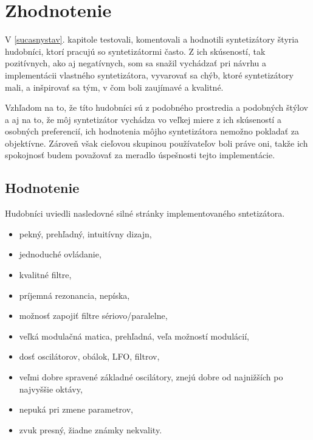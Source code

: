 \chapter{Zhodnotenie}

V \ref{sucasnystav}. kapitole testovali, komentovali a hodnotili syntetizátory štyria hudobníci, ktorí pracujú so syntetizátormi často. Z ich skúseností, tak pozitívnych, ako aj negatívnych, som sa snažil vychádzať pri návrhu a implementácii vlastného syntetizátora, vyvarovať sa chýb, ktoré syntetizátory mali, a inšpirovať sa tým, v čom boli zaujímavé a kvalitné.

Vzhľadom na to, že títo hudobníci sú z podobného prostredia a podobných štýlov a aj na to, že môj syntetizátor vychádza vo veľkej miere z ich skúseností a osobných preferencií, ich hodnotenia môjho syntetizátora nemožno pokladať za objektívne. Zároveň však cieľovou skupinou používateľov boli práve oni, takže ich spokojnosť budem považovať za meradlo úspešnosti tejto implementácie.

\section{Hodnotenie}

Hudobníci uviedli nasledovné silné stránky implementovaného sntetizátora.

\begin{itemize}
\setlength{\itemsep}{-0.5ex}
\item pekný, prehľadný, intuitívny dizajn,
\item jednoduché ovládanie,
\item kvalitné filtre,
\item príjemná rezonancia, nepíska,
\item možnosť zapojiť filtre sériovo/paralelne,
\item veľká modulačná matica, prehľadná, veľa možností modulácií,
\item dosť oscilátorov, obálok, LFO, filtrov, 
\item veľmi dobre spravené základné oscilátory, znejú dobre od najnižších po najvyššie oktávy,
\item nepuká pri zmene parametrov,
\item zvuk presný, žiadne známky nekvality.
\end{itemize}

